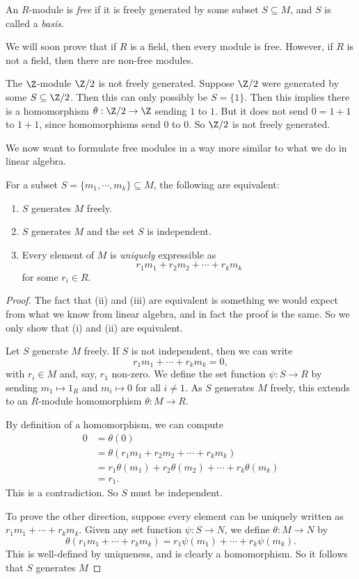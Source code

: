 \documentclass[a4paper]{article}
\begin{document}
\begin{defi}
  An $R$-module is \emph{free} if it is freely generated by some subset $S \subseteq M$, and $S$ is called a \emph{basis}.
\end{defi}
We will soon prove that if $R$ is a field, then every module is free. However, if $R$ is not a field, then there are non-free modules.
\begin{eg}
  The $\Z$-module $\Z/2$ is not freely generated. Suppose $\Z/2$ were generated by some $S \subseteq \Z/2$. Then this can only possibly be $S = \{1\}$. Then this implies there is a homomorphism $\theta: \Z/2 \to \Z$ sending $1$ to $1$. But it does not send $0 = 1 + 1$ to $1 + 1$, since homomorphisms send $0$ to $0$. So $\Z/2$ is not freely generated.
\end{eg}

We now want to formulate free modules in a way more similar to what we do in linear algebra.
\begin{prop}
  For a subset $S = \{m_1, \cdots, m_k\} \subseteq M$, the following are equivalent:
  \begin{enumerate}
    \item $S$ generates $M$ freely.
    \item $S$ generates $M$ and the set $S$ is independent.
    \item Every element of $M$ is \emph{uniquely} expressible as
      \[
        r_1 m_1 + r_2 m_2 + \cdots + r_k m_k
      \]
      for some $r_i \in R$.
  \end{enumerate}
\end{prop}
\begin{proof}
  The fact that (ii) and (iii) are equivalent is something we would expect from what we know from linear algebra, and in fact the proof is the same. So we only show that (i) and (ii) are equivalent.

  Let $S$ generate $M$ freely. If $S$ is not independent, then we can write
  \[
    r_1 m_1 + \cdots + r_k m_k = 0,
  \]
  with $r_i \in M$ and, say, $r_1$ non-zero. We define the set function $\psi: S \to R$ by sending $m_1 \mapsto 1_R$ and $m_i \mapsto 0$ for all $i \not= 1$. As $S$ generates $M$ freely, this extends to an $R$-module homomorphism $\theta: M \to R$.

  By definition of a homomorphism, we can compute
  \begin{align*}
    0 &= \theta(0)\\
    &= \theta(r_1 m_1 + r_2 m_2 + \cdots + r_k m_k) \\
    &= r_1\theta(m_1) + r_2 \theta(m_2) + \cdots + r_k \theta(m_k)\\
    &= r_1.
  \end{align*}
  This is a contradiction. So $S$ must be independent.

  To prove the other direction, suppose every element can be uniquely written as $r_1m_1 + \cdots + r_k m_k$. Given any set function $\psi: S \to N$, we define $\theta: M \to N$ by
  \[
    \theta(r_1m_1 + \cdots + r_k m_k) = r_1 \psi(m_1) + \cdots + r_k \psi(m_k).
  \]
  This is well-defined by uniqueness, and is clearly a homomorphism. So it follows that $S$ generates $M$
\end{proof}
\end{document}
